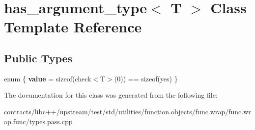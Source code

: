 \hypertarget{classhas__argument__type}{}\section{has\+\_\+argument\+\_\+type$<$ T $>$ Class Template Reference}
\label{classhas__argument__type}
\subsection*{Public Types}
\begin{DoxyCompactItemize}
\item 
\mbox{\label{classhas__argument__type_a0182d52b8e0cceab2c2bf253937f13c0}} 
enum \{ {\bfseries value} = sizeof(check$<$T$>$(0)) == sizeof(yes)
 \}
\end{DoxyCompactItemize}


The documentation for this class was generated from the following file\+:\begin{DoxyCompactItemize}
\item 
contracts/libc++/upstream/test/std/utilities/function.\+objects/func.\+wrap/func.\+wrap.\+func/types.\+pass.\+cpp\end{DoxyCompactItemize}
